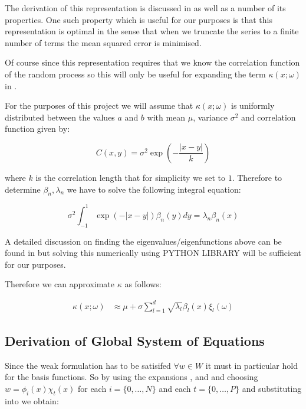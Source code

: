 The derivation of this representation is discussed in \cite{stochastic-fem} as
well as a number of its properties. One such property which is useful for our
purposes is that this representation is optimal in the sense that when we
truncate the series to a finite number of terms the mean squared error is
minimised.

Of course since this representation requires that we know the correlation
function of the random process so this will only be useful for expanding the
term $\kappa(x;\omega)$ in .

For the purposes of this project we will assume that $\kappa(x;\omega)$ is
uniformly distributed between the values $a$ and $b$ with mean $\mu$,
variance $\sigma^2$ and correlation function given by:

\begin{equation}
    C(x, y) = \sigma^2\exp\left(-\frac{|x - y|}{k}\right)
\end{equation}

where $k$ is the correlation length that for simplicity we set to $1$.
Therefore to determine $\beta_n, \lambda_n$ we have to solve the following
integral equation:

\begin{equation}
    \sigma^2\int_{-1}^1\exp(-|x - y|)\beta_n(y) dy = \lambda_n\beta_n(x)
\end{equation}

A detailed discussion on finding the eigenvalues/eigenfunctions above can be
found in \cite{stochastic-fem} but solving this numerically using
 PYTHON LIBRARY
will be sufficient for our purposes.

Therefore we can approximate $\kappa$ as follows:

\begin{align}\label{eq:oned-stochastic-kl-kappa}
    \kappa(x;\omega) &\approx \mu + \sigma\sum_{l=1}^d\sqrt{\lambda_l}\beta_l(x)\xi_l(\omega)
\end{align}

\subsection{Derivation of Global System of Equations}

Since the weak formulation  has to be satisifed
$\forall w \in W$ it must in particular hold for the basis functions. So by
using the expansions ,
 and  and
choosing $w = \phi_i(x)\chi_t(x)$ for each $i = \{0,\ldots,N\}$ and each $t =
\{0,\ldots,P\}$ and substituting into  we
obtain:


